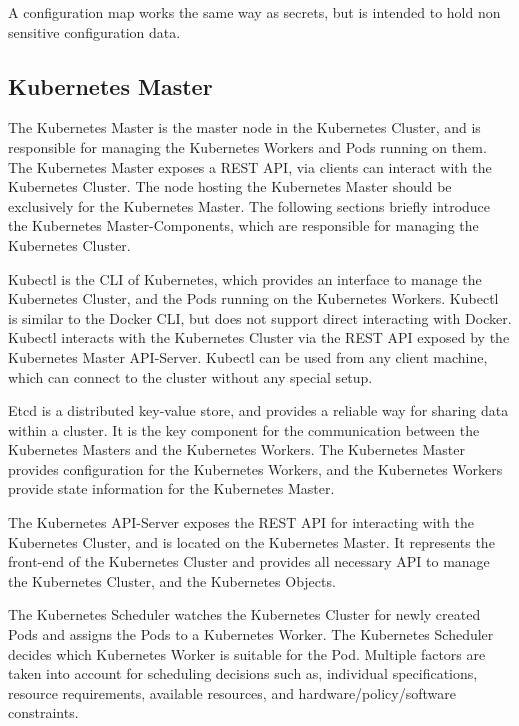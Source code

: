 A configuration map works the same way as secrets, but is intended to hold non sensitive configuration data\cite{CNCFKubernetesConfigMap2018}.

\subsection{Kubernetes Master}
\label{sec:caas-kubernetes-master}
The Kubernetes Master is the master node in the Kubernetes Cluster, and is responsible for managing the Kubernetes Workers and Pods running on them. The Kubernetes Master exposes a REST API, via clients can interact with the Kubernetes Cluster. The node hosting the Kubernetes Master should be exclusively for the Kubernetes Master. The following sections briefly introduce the Kubernetes Master-Components, which are responsible for managing the Kubernetes Cluster\cite{CNCFKubernetesComponents2018}.

Kubectl is the CLI of Kubernetes, which provides an interface to manage the Kubernetes Cluster, and the Pods running on the Kubernetes Workers. Kubectl is similar to the Docker CLI, but does not support direct interacting with Docker. Kubectl interacts with the Kubernetes Cluster via the REST API exposed by the Kubernetes Master API-Server. Kubectl can be used from any client machine, which can connect to the cluster without any special setup.

Etcd is a distributed key-value store, and provides a reliable way for sharing data within a cluster. It is the key component for the communication between the Kubernetes Masters and the Kubernetes Workers. The Kubernetes Master provides configuration for the Kubernetes Workers, and the Kubernetes Workers provide state information for the Kubernetes Master\cite{CoreOSETCD2018}.

The Kubernetes API-Server exposes the REST API for interacting with the Kubernetes Cluster, and is located on the Kubernetes Master. It represents the front-end of the Kubernetes Cluster and provides all necessary API to manage the Kubernetes Cluster, and the Kubernetes Objects.

The Kubernetes Scheduler watches the Kubernetes Cluster for newly created Pods and assigns the Pods to a Kubernetes Worker. The Kubernetes Scheduler decides which Kubernetes Worker is suitable for the Pod. Multiple factors are taken into account for scheduling decisions such as, individual specifications, resource requirements, available resources, and hardware/policy/software constraints.

